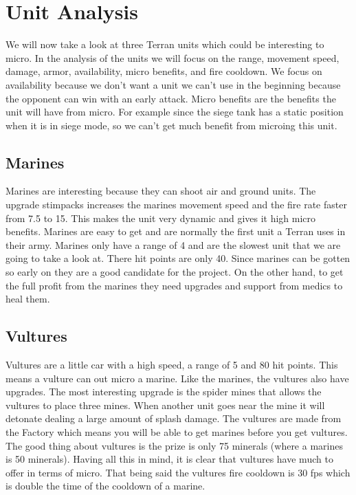 \section{Unit Analysis}
We will now take a look at three Terran units which could be interesting to micro. In the analysis of the units we will
focus on the range, movement speed, damage, armor, availability, micro benefits, and fire cooldown. We focus on availability because we don't want a unit we can't use in the beginning because the opponent can
win with an early attack. Micro benefits are the benefits the unit will have from micro. For example since the siege tank has a static position when it is in siege mode, so we can't get much benefit from microing
this unit. 

\subsection{Marines}
Marines are interesting because they can shoot air and ground units. The upgrade stimpacks increases the marines movement speed and the fire rate
faster from 7.5 to 15. This makes the unit very dynamic and gives it high micro benefits. Marines are easy to get and are normally the first unit a Terran uses in
their army. Marines only have a range of 4 and are the slowest unit that we are going to take a look at. There
hit points are only 40. Since marines can be gotten so early on they are a good candidate for the project. On the other hand, to get the full profit from the
marines they need upgrades and support from medics to heal them. 

\subsection{Vultures}
Vultures are a little car with a high speed, a range of 5 and 80 hit points. This means a vulture can out micro a marine. Like the marines, the
vultures also have upgrades. The most interesting upgrade is the spider mines that allows the vultures to place three mines. When another unit goes near the mine it will detonate dealing a large amount of splash damage. The vultures are made
from the Factory which means you will be able to get marines before you get vultures. The good thing about vultures is the prize is only 75 minerals (where
a marines is 50 minerals). Having all this in mind, it is clear that vultures have much to offer in terms of micro.
That being said the vultures fire cooldown is 30 fps which is double the time of the cooldown of a marine.\cite{wiki_vulture}

